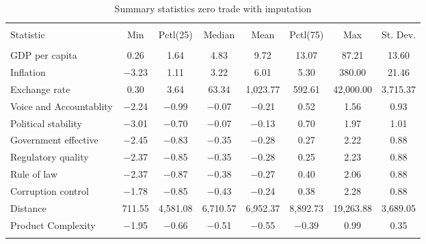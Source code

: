 
\begin{table}[H] \centering 
  \caption{Summary statistics zero trade with imputation} 
  \label{fig:sum_notrade_imp} 
\begin{tabular}{@{\extracolsep{5pt}}lccccccc} 
\\[-1.8ex]\hline 
\hline \\[-1.8ex] 
Statistic & \multicolumn{1}{c}{Min} & \multicolumn{1}{c}{Pctl(25)} & \multicolumn{1}{c}{Median} & \multicolumn{1}{c}{Mean} & \multicolumn{1}{c}{Pctl(75)} & \multicolumn{1}{c}{Max} & \multicolumn{1}{c}{St. Dev.} \\ 
\hline \\[-1.8ex] 
GDP per capita & 0.26 & 1.64 & 4.83 & 9.72 & 13.07 & 87.21 & 13.60 \\ 
Inflation & $-$3.23 & 1.11 & 3.22 & 6.01 & 5.30 & 380.00 & 21.46 \\ 
Exchange rate & 0.30 & 3.64 & 63.34 & 1,023.77 & 592.61 & 42,000.00 & 3,715.37 \\ 
Voice and Accountablity & $-$2.24 & $-$0.99 & $-$0.07 & $-$0.21 & 0.52 & 1.56 & 0.93 \\ 
Political stability & $-$3.01 & $-$0.70 & $-$0.07 & $-$0.13 & 0.70 & 1.97 & 1.01 \\ 
Government effective & $-$2.45 & $-$0.83 & $-$0.35 & $-$0.28 & 0.27 & 2.22 & 0.88 \\ 
Regulatory quality & $-$2.37 & $-$0.85 & $-$0.35 & $-$0.28 & 0.25 & 2.23 & 0.88 \\ 
Rule of law & $-$2.37 & $-$0.87 & $-$0.38 & $-$0.27 & 0.40 & 2.06 & 0.88 \\ 
Corruption control & $-$1.78 & $-$0.85 & $-$0.43 & $-$0.24 & 0.38 & 2.28 & 0.88 \\ 
Distance & 711.55 & 4,581.08 & 6,710.57 & 6,952.37 & 8,892.73 & 19,263.88 & 3,689.05 \\ 
Product Complexity & $-$1.95 & $-$0.66 & $-$0.51 & $-$0.55 & $-$0.39 & 0.99 & 0.35 \\ 
\hline \\[-1.8ex] 
\end{tabular} 
\end{table} 
